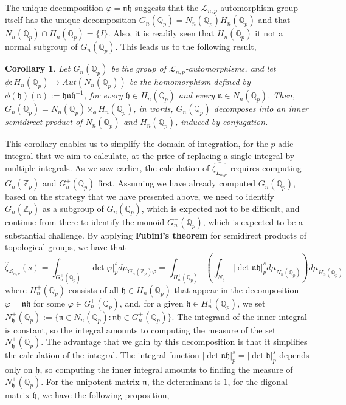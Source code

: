 \documentclass[12pt]{article}
\newtheorem{corollary}[theorem]{Corollary}
\begin{document}
The unique decomposition $\varphi=\mathfrak{nh}$ suggests that the $\mathcal{L}_{n,p}$-automorphism group itself has the unique decomposition $G_n(\mathbb{Q}_p)= N_n(\mathbb{Q}_p) H_n(\mathbb{Q}_p)$ and that $N_n(\mathbb{Q}_p)\cap H_n(\mathbb{Q}_p)=\{I\}$. Also, it is readily seen that $ H_n(\mathbb{Q}_p)$ it not a normal subgroup of $G_n(\mathbb{Q}_p)$. This leads us to the following result,
\begin{corollary}
Let $G_n(\mathbb{Q}_p)$ be the group of $\mathcal{L}_{n,p}$-automorphisms, and let $\phi: H_n(\mathbb{Q}_p)\rightarrow Aut( N_n(\mathbb{Q}_p))$ be the homomorphism defined by $\phi(\mathfrak{h})(\mathfrak{n}):=\mathfrak{hn}\mathfrak{h}^{-1}$, for every $\mathfrak{h}\in  H_n(\mathbb{Q}_p)$ and every $\mathfrak{n}\in  N_n(\mathbb{Q}_p)$. Then, $G_n(\mathbb{Q}_p)= N_n(\mathbb{Q}_p)\rtimes_{\phi} H_n(\mathbb{Q}_p)$, in words, $G_n(\mathbb{Q}_p)$ decomposes into an inner semidirect product of $N_n(\mathbb{Q}_p)$ and $ H_n(\mathbb{Q}_p)$, induced by conjugation.
\end{corollary}
This corollary enables us to simplify the domain of integration, for the $p$-adic integral that we aim to calculate, at the price of replacing a single integral by multiple integrals. As we saw earlier, the calculation of $\hat{\zeta_{L_{n,p}}}$ requires computing $G_n(\mathbb{Z}_p)$ and $G_n^+(\mathbb{Q}_p)$ first. Assuming we have already computed $G_n(\mathbb{Q}_p)$, based on the strategy that we have presented above, we need to identify $G_n(\mathbb{Z}_p)$ as a subgroup of $G_n(\mathbb{Q}_p)$, which is expected not to be difficult, and continue from there to identify the monoid $G_n^+(\mathbb{Q}_p)$, which is expected to be a substantial challenge. By applying \textbf{Fubini's theorem} for semidirect products of topological groups, we have that \[\hat\zeta_{\mathcal{L}_{n,p}}(s)=\displaystyle\int_{G_n^+(\mathbb{Q}_p)}|\det\varphi|_p^sd\mu_{G_n(\mathbb{Z}_p)\varphi}=\displaystyle\int_{ H_n^+(\mathbb{Q}_p)}\left(\displaystyle\int_{ N_{\mathfrak{h}}^+}|\det\mathfrak{nh}|_p^sd\mu_{N_n(\mathbb{Q}_p)}\right)d\mu_{H_n(\mathbb{Q}_p)}\]
where $H_n^+(\mathbb{Q}_p)$ consists of all $\mathfrak{h}\in H_n(\mathbb{Q}_p)$ that appear in the decomposition $\varphi=\mathfrak{nh}$ for some $\varphi\in G_n^+(\mathbb{Q}_p)$, and, for a given $\mathfrak{h}\in H_n^+(\mathbb{Q}_p)$, we set $N_\mathfrak{h}^+(\mathbb{Q}_p):=\{\mathfrak{n}\in N_n(\mathbb{Q}_p) : \mathfrak{nh}\in G_n^+(\mathbb{Q}_p)\}$. The integrand of the inner integral is constant, so the integral amounts to computing the measure of the set $N_{\mathfrak{h}}^+(\mathbb{Q}_p)$. The advantage that we gain by this decomposition is that it simplifies the calculation of the integral. The integral function $|\det\mathfrak{nh}|_p^s=|\det\mathfrak{h}|_p^s$ depends only on $\mathfrak{h}$, so computing the inner integral amounts to finding the measure of $N_{\mathfrak{h}}^+(\mathbb{Q}_p)$. For the unipotent matrix $\mathfrak{n}$, the determinant is $1$, for the digonal matrix $\mathfrak{h}$, we have the following proposition,
\end{document}
